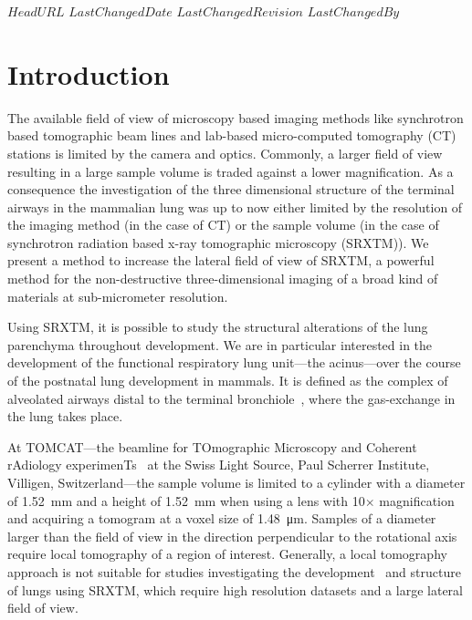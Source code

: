 \svnidlong
{$HeadURL$}
{$LastChangedDate$}
{$LastChangedRevision$}
{$LastChangedBy$}
%
%
\section{Introduction}

The available field of view of microscopy based imaging methods like synchrotron based tomographic beam lines and lab-based micro-computed tomography (\micro CT) stations is limited by the camera and optics. Commonly, a larger field of view resulting in a large sample volume is traded against a lower magnification. As a consequence the investigation of the three dimensional structure of the terminal airways in the mammalian lung was up to now either limited by the resolution of the imaging method (in the case of \micro CT) or the sample volume (in the case of synchrotron radiation based x-ray tomographic microscopy (SRXTM)). We present a method to increase the lateral field of view of SRXTM, a powerful method for the non-destructive three-dimensional imaging of a broad kind of materials at sub-micrometer resolution. 

Using SRXTM, it is possible to study the structural alterations of the lung parenchyma throughout development. We are in particular interested in the development of the functional respiratory lung unit---the acinus---over the course of the postnatal lung development in mammals. It is defined as the complex of alveolated airways distal to the terminal bronchiole~\cite{Rodriguez1987}, where the gas-exchange in the lung takes place.

At TOMCAT---the beamline for TOmographic Microscopy and Coherent rAdiology experimenTs~\cite{Stampanoni2007} at the Swiss Light Source, Paul Scherrer Institute, Villigen, Switzerland---the sample volume is limited to a cylinder with a diameter of \SI{1.52}{\milli\meter} and a height of \SI{1.52}{\milli\meter} when using a lens with 10$\times$ magnification and acquiring a tomogram at a voxel size of \SI{1.48}{\micro\meter}. Samples of a diameter larger than the field of view in the direction perpendicular to the rotational axis require local tomography of a region of interest. Generally, a local tomography approach is not suitable for studies investigating the development~\cite{Schittny2008,Mund2008,Haberthuer2009c} and structure~\cite{Tsuda2008} of lungs using SRXTM, which require high resolution datasets and a large lateral field of view.

